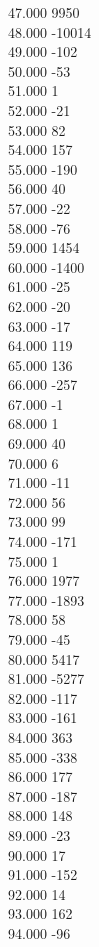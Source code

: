{ 47.000	9950 \\
 48.000	-10014 \\
 49.000	-102 \\
 50.000	-53 \\
 51.000	1 \\
 52.000	-21 \\
 53.000	82 \\
 54.000	157 \\
 55.000	-190 \\
 56.000	40 \\
 57.000	-22 \\
 58.000	-76 \\
 59.000	1454 \\
 60.000	-1400 \\
 61.000	-25 \\
 62.000	-20 \\
 63.000	-17 \\
 64.000	119 \\
 65.000	136 \\
 66.000	-257 \\
 67.000	-1 \\
 68.000	1 \\
 69.000	40 \\
 70.000	6 \\
 71.000	-11 \\
 72.000	56 \\
 73.000	99 \\
 74.000	-171 \\
 75.000	1 \\
 76.000	1977 \\
 77.000	-1893 \\
 78.000	58 \\
 79.000	-45 \\
 80.000	5417 \\
 81.000	-5277 \\
 82.000	-117 \\
 83.000	-161 \\
 84.000	363 \\
 85.000	-338 \\
 86.000	177 \\
 87.000	-187 \\
 88.000	148 \\
 89.000	-23 \\
 90.000	17 \\
 91.000	-152 \\
 92.000	14 \\
 93.000	162 \\
 94.000	-96 \\
}
